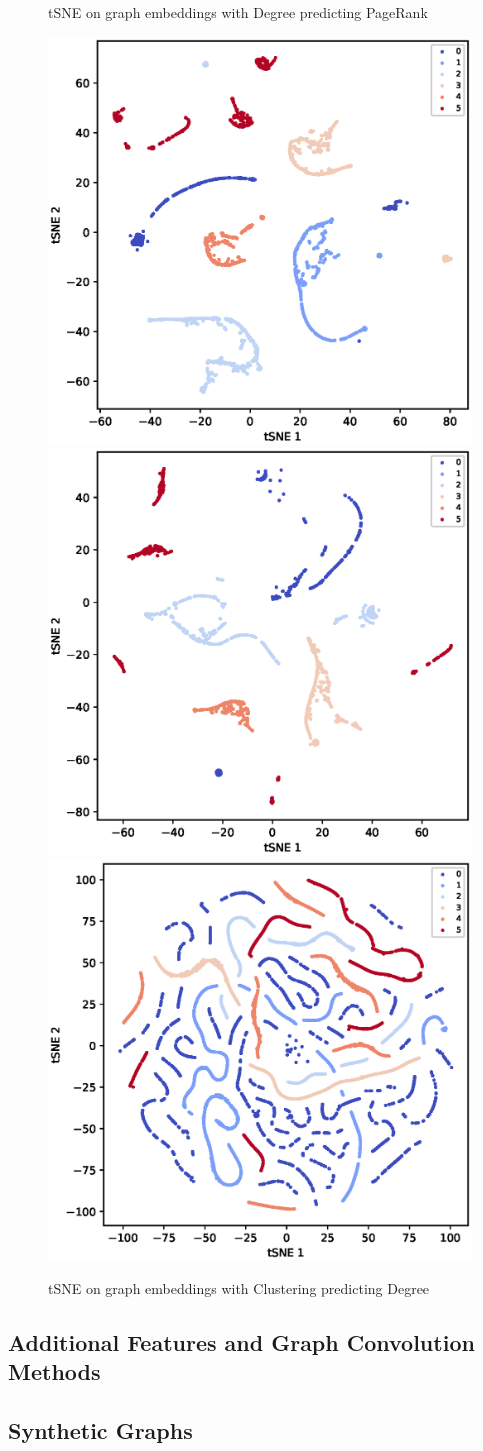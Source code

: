 \documentclass[sigconf]{acmart}
\begin{document}
\begin{figure}[h]
\begin{center}
      \caption{tSNE on graph embeddings with Degree predicting PageRank}
    \hspace*{-1.5in}
      \includegraphics[width=0.35\linewidth]{fig/Cora_2to1_tSNE.eps}
      \includegraphics[width=0.35\linewidth]{fig/Citeseer_2to1_tSNE.eps}
      \includegraphics[width=0.35\linewidth]{fig/PubMed_2to1_tSNE.eps}
      \hspace*{-1.5in}

      \caption{tSNE on graph embeddings with Clustering predicting Degree}
  \end{center}
  \end{figure}









\subsection{Additional Features and Graph Convolution Methods}



\subsection{Synthetic Graphs}
\end{document}
